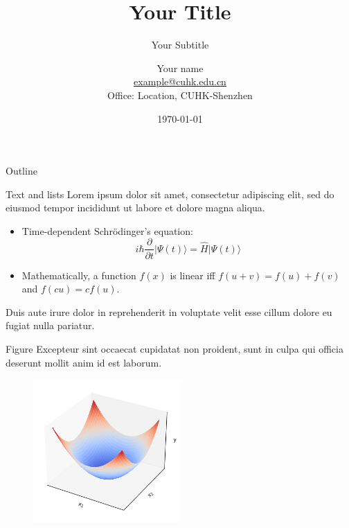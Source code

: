 \documentclass{beamer}
\title[Short title]{Your Title}
\subtitle{Your Subtitle}
\author[Short name]{
    Your name \\
    \vspace{0.1in}
    \footnotesize{\href{mailto:example@cuhk.edu.cn}{example@cuhk.edu.cn}}\\
    \footnotesize{Office: Location, CUHK-Shenzhen}}
\institute[CUHK-Shenzhen]{The Chinese University of Hong Kong, Shenzhen}
\date{\today}
\begin{document}
\frame[plain]{\maketitle}

\begin{frame}{Outline}
    \label{outline}
    \tableofcontents{}
\end{frame}


\begin{frame}{Text and lists}
    Lorem ipsum dolor sit amet, consectetur adipiscing elit, sed do eiusmod tempor incididunt ut labore et dolore magna aliqua. \pause
    \begin{itemize}
      \item Time-dependent Schr\"{o}dinger's equation: $$i \hbar \frac{\partial}{\partial t}\lvert\Psi(t)\rangle = \hat H \lvert\Psi(t)\rangle$$ \pause
      \item Mathematically, a function $f(x)$ is linear iff $f(u+v)=f(u)+f(v)$ and $f(cu)=cf(u)$. \pause
    \end{itemize} \pause
    \vspace{0.1in}
    Duis aute irure dolor in reprehenderit in voluptate velit esse cillum dolore eu fugiat nulla pariatur. \pause
\end{frame}

\begin{frame}{Figure}
    Excepteur sint occaecat cupidatat non proident, sunt in culpa qui officia deserunt mollit anim id est laborum.
    \begin{figure}
        \includegraphics[width=0.5\textwidth]{images/convex_surface.png}
    \end{figure}
\end{frame}
\end{document}
